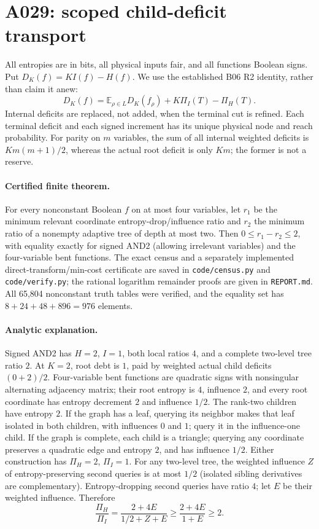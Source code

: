 \documentclass{article}
\begin{document}
\section*{A029: scoped child-deficit transport}
All entropies are in bits, all physical inputs fair, and all functions
Boolean signs. Put $D_K(f)=KI(f)-H(f)$. We use the established B06 R2
identity, rather than claim it anew:
\[
D_K(f)=\mathbb E_{\rho\in L}D_K(f_\rho)
 +K\Pi_I(T)-\Pi_H(T).
\]
Internal deficits are replaced, not added, when the terminal cut is
refined. Each terminal deficit and each signed increment has its unique
physical node and reach probability. For parity on $m$ variables, the
sum of all internal weighted deficits is $Km(m+1)/2$, whereas the
actual root deficit is only $Km$; the former is not a reserve.

\paragraph{Certified finite theorem.}
For every nonconstant Boolean $f$ on at most four variables, let $r_1$
be the minimum relevant coordinate entropy-drop/influence ratio and
$r_2$ the minimum ratio of a nonempty adaptive tree of depth at most two.
Then $0\le r_1-r_2\le2$, with equality exactly for signed AND2 (allowing
irrelevant variables) and the four-variable bent functions. The exact
census and a separately implemented direct-transform/min-cost certificate
are saved in \texttt{code/census.py} and \texttt{code/verify.py}; the
rational logarithm remainder proofs are given in \texttt{REPORT.md}.
All 65,804 nonconstant truth tables were verified, and the equality set
has $8+24+48+896=976$ elements.

\paragraph{Analytic explanation.}
Signed AND2 has $H=2$, $I=1$, both local ratios $4$, and a complete
two-level tree ratio $2$. At $K=2$, root debt is $1$, paid by weighted
actual child deficits $(0+2)/2$. Four-variable bent functions are
quadratic signs with nonsingular alternating adjacency matrix; their
root entropy is $4$, influence $2$, and every root coordinate has
entropy decrement $2$ and influence $1/2$. The rank-two children have
entropy $2$. If the graph has a leaf, querying its neighbor makes that
leaf isolated in both children, with influences $0$ and $1$; query it
in the influence-one child. If the graph is complete, each child is a
triangle; querying any coordinate preserves a quadratic edge and
entropy $2$, and has influence $1/2$. Either construction has
$\Pi_H=2$, $\Pi_I=1$.
For any two-level tree, the weighted influence $Z$ of entropy-preserving
second queries is at most $1/2$ (isolated sibling derivatives are
complementary). Entropy-dropping second queries have ratio $4$; let
$E$ be their weighted influence. Therefore
\[
\frac{\Pi_H}{\Pi_I}=
 \frac{2+4E}{1/2+Z+E}\ge\frac{2+4E}{1+E}\ge2.
\]
\end{document}
